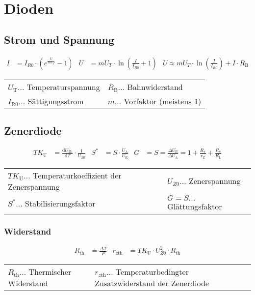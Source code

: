 \section{Dioden}
	\subsection{Strom und Spannung}
		\begin{align*}
			I&=I_{R0}\cdot\left(e^{\frac{U}{mU_T}}-1\right) 
			& U&=mU_T\cdot\ln\left(\frac{I}{I_{R0}}+1\right) 
			& U\approx mU_T\cdot\ln\left(\frac{I}{I_{R0}}\right)+I\cdot R_{\mathrm{B}}
		\end{align*}

		\begin{table}[h]
		\begin{tabular}{ll}
		$U_{\mathrm{T}}\dots$ Temperaturspannung & $R_{\mathrm{B}}\dots$ Bahnwiderstand\\
		$I_{\mathrm{R}0}\dots$ Sättigungsstrom& $m\dots$ Vorfaktor (meistens 1)\\
		\end{tabular}
		\end{table}

	\subsection{Zenerdiode}
		\begin{align*}
			TK_{\mathrm{U}}&=\frac{\mathrm{d}U_{Z0}}{\mathrm{d}T}\cdot\frac{1}{U_{Z0}}
			& S^*&=S\cdot\frac{U_{\mathrm{A}}}{U_{\mathrm{E}}}
			& G&=S=\frac{\Delta U_{\mathrm{E}}}{\Delta U_{\mathrm{A}}}=1+\frac{R_{\mathrm{v}}}{r_{\mathrm{Z}}}+\frac{R_{\mathrm{v}}}{R_{\mathrm{L}}}
		\end{align*}

		\begin{table}[h]
		\begin{tabular}{ll}
		$TK_{\mathrm{U}}\dots$ Temperaturkoeffizient der Zenerspannung & $U_{Z0}\dots$ Zenerspannung\\
		$S^*\dots$ Stabilisierungsfaktor & $G=S\dots$ Glättungsfaktor\\
		\end{tabular}
		\end{table}

		\subsubsection{Widerstand}
			\begin{align*}
				R_{\mathrm{th}}&=\frac{\Delta T}{P} & r_{z\mathrm{th}}&=TK_{\mathrm{U}}\cdot U_{Z0}^2\cdot R_{\mathrm{th}}
			\end{align*}

			\begin{table}[h]
			\begin{tabular}{ll}
			$R_{\mathrm{th}}\dots$ Thermischer Widerstand & $r_{z\mathrm{th}}\dots$ Temperaturbedingter Zusatzwiderstand der Zenerdiode\\
			\end{tabular}
			\end{table}
		\clearpage
